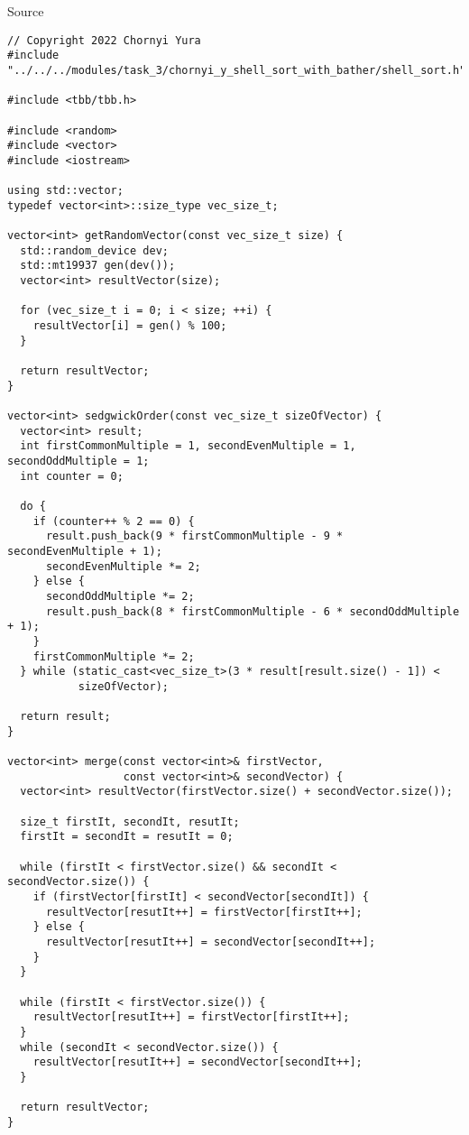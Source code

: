 \documentclass{report}
\begin{document}
\begin{center}
Source
\end{center}
\begin{lstlisting}
// Copyright 2022 Chornyi Yura
#include "../../../modules/task_3/chornyi_y_shell_sort_with_bather/shell_sort.h"

#include <tbb/tbb.h>

#include <random>
#include <vector>
#include <iostream>

using std::vector;
typedef vector<int>::size_type vec_size_t;

vector<int> getRandomVector(const vec_size_t size) {
  std::random_device dev;
  std::mt19937 gen(dev());
  vector<int> resultVector(size);

  for (vec_size_t i = 0; i < size; ++i) {
    resultVector[i] = gen() % 100;
  }

  return resultVector;
}

vector<int> sedgwickOrder(const vec_size_t sizeOfVector) {
  vector<int> result;
  int firstCommonMultiple = 1, secondEvenMultiple = 1, secondOddMultiple = 1;
  int counter = 0;

  do {
    if (counter++ % 2 == 0) {
      result.push_back(9 * firstCommonMultiple - 9 * secondEvenMultiple + 1);
      secondEvenMultiple *= 2;
    } else {
      secondOddMultiple *= 2;
      result.push_back(8 * firstCommonMultiple - 6 * secondOddMultiple + 1);
    }
    firstCommonMultiple *= 2;
  } while (static_cast<vec_size_t>(3 * result[result.size() - 1]) <
           sizeOfVector);

  return result;
}

vector<int> merge(const vector<int>& firstVector,
                  const vector<int>& secondVector) {
  vector<int> resultVector(firstVector.size() + secondVector.size());

  size_t firstIt, secondIt, resutIt;
  firstIt = secondIt = resutIt = 0;

  while (firstIt < firstVector.size() && secondIt < secondVector.size()) {
    if (firstVector[firstIt] < secondVector[secondIt]) {
      resultVector[resutIt++] = firstVector[firstIt++];
    } else {
      resultVector[resutIt++] = secondVector[secondIt++];
    }
  }

  while (firstIt < firstVector.size()) {
    resultVector[resutIt++] = firstVector[firstIt++];
  }
  while (secondIt < secondVector.size()) {
    resultVector[resutIt++] = secondVector[secondIt++];
  }

  return resultVector;
}


\end{lstlisting}
\end{document}
